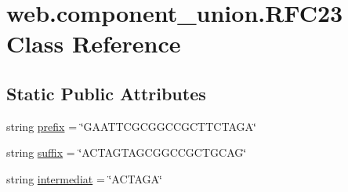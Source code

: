 \hypertarget{classweb_1_1component__union_1_1_r_f_c23}{\section{web.\-component\-\_\-union.\-R\-F\-C23 Class Reference}
\label{classweb_1_1component__union_1_1_r_f_c23}
}
\subsection*{Static Public Attributes}
\begin{DoxyCompactItemize}
\item 
string \hyperlink{classweb_1_1component__union_1_1_r_f_c23_abdc88199a66f17449ef9c9997da0e97a}{prefix} = \char`\"{}G\-A\-A\-T\-T\-C\-G\-C\-G\-G\-C\-C\-G\-C\-T\-T\-C\-T\-A\-G\-A\char`\"{}
\item 
string \hyperlink{classweb_1_1component__union_1_1_r_f_c23_ac0b9a3c7700f70059eaca989afb4b392}{suffix} = \char`\"{}A\-C\-T\-A\-G\-T\-A\-G\-C\-G\-G\-C\-C\-G\-C\-T\-G\-C\-A\-G\char`\"{}
\item 
string \hyperlink{classweb_1_1component__union_1_1_r_f_c23_abc3b7672763428384e052ccbfc264389}{intermediat} = \char`\"{}A\-C\-T\-A\-G\-A\char`\"{}
\end{DoxyCompactItemize}


